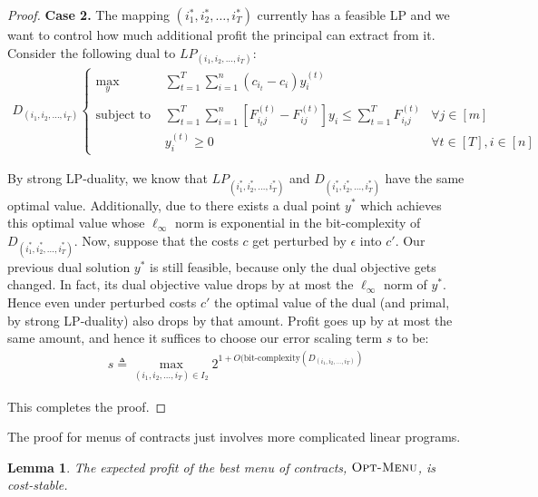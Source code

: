 \documentclass{article}
\newtheorem{lemma}[theorem]{Lemma}
\newcommand{\OMenu}{\textsc{Opt-Menu}}
\newcommand{\actionmapping}{(i_1, i_2, \ldots, i_T)}
\newcommand{\optactionmapping}{(i^*_1, i^*_2, \ldots, i^*_T)}
\begin{document}
\begin{proof}
  \textbf{Case 2.} The mapping $\optactionmapping$ currently has a feasible LP and we want to control how much additional profit the principal can extract from it. Consider the following dual to $LP_{\actionmapping}$:
  \begin{align*}
  D_{\actionmapping} \left\{
    \begin{array}{rll}
                  \max_y & \sum_{t=1}^T \sum_{i=1}^n (c_{i_t} - c_i) y^{(t)}_i \\
      \\
      \text{subject to } & \sum_{t=1}^T \sum_{i=1}^n \left[ F^{(t)}_{i_tj} - F^{(t)}_{ij} \right] y_i \le \sum_{t=1}^T F^{(t)}_{i_tj} & \forall j \in [m] \\
                         & y^{(t)}_i \ge 0                                                                                            & \forall t \in [T], i \in [n]
    \end{array}
  \right.
  \end{align*}
  
  By strong LP-duality, we know that $LP_{\optactionmapping}$ and $D_{\optactionmapping}$ have the same optimal value. Additionally, due to \cite{grotschel2012geometric} there exists a dual point $y^*$ which achieves this optimal value whose $\ell_\infty$ norm is exponential in the bit-complexity of $D_{\optactionmapping}$. Now, suppose that the costs $c$ get perturbed by $\epsilon$ into $c'$. Our previous dual solution $y^*$ is still feasible, because only the dual objective gets changed. In fact, its dual objective value drops by at most the $\ell_\infty$ norm of $y^*$. Hence even under perturbed costs $c'$ the optimal value of the dual (and primal, by strong LP-duality) also drops by that amount. Profit goes up by at most the same amount, and hence it suffices to choose our error scaling term $s$ to be:
  \begin{align*}
    s \triangleq \max_{\actionmapping \in I_2} 2^{1 + O(\text{bit-complexity}(D_{\actionmapping})}
  \end{align*}
  
  This completes the proof.
\end{proof}

The proof for menus of contracts just involves more complicated linear programs.

\begin{lemma}\label{lem:menu-stable}
  The expected profit of the best menu of contracts, $\OMenu$, is cost-stable.
\end{lemma}
\end{document}

